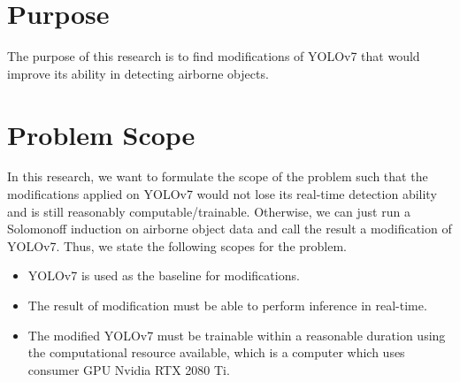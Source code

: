 \section{Purpose}
    The purpose of this research is to find modifications of YOLOv7 that would improve its ability in detecting airborne objects.

\section{Problem Scope}
    In this research, we want to formulate the scope of the problem such that the modifications applied
    on YOLOv7 would not lose its real-time detection ability and is still reasonably computable/trainable.
    Otherwise, we can just run a Solomonoff induction on airborne object data and call the result a modification
    of YOLOv7. Thus, we state the following scopes for the problem.
    \begin{itemize}[noitemsep,topsep=0pt]
        \item YOLOv7 is used as the baseline for modifications. 
        \item The result of modification must be able to perform inference in real-time.
        \item The modified YOLOv7 must be trainable within a reasonable duration using the computational resource
        available, which is a computer which uses consumer GPU Nvidia RTX 2080 Ti.
    \end{itemize}
